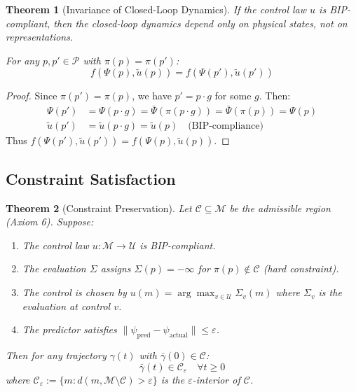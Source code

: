 \documentclass[11pt]{article}
\newtheorem{theorem}{Theorem}[section]
\begin{document}
\begin{theorem}[Invariance of Closed-Loop Dynamics]
If the control law $u$ is BIP-compliant,
then the closed-loop dynamics depend only on physical states, not on representations.

For any $p, p' \in \mathcal{P}$ with $\pi(p) = \pi(p')$:
\[
f(\Psi(p), \tilde{u}(p)) = f(\Psi(p'), \tilde{u}(p'))
\]
\end{theorem}

\begin{proof}
Since $\pi(p') = \pi(p)$, we have $p' = p \cdot g$ for some $g$. Then:
\begin{align*}
\Psi(p') &= \Psi(p \cdot g) = \bar{\Psi}(\pi(p \cdot g)) = \bar{\Psi}(\pi(p)) = \Psi(p) \\
\tilde{u}(p') &= \tilde{u}(p \cdot g) = \tilde{u}(p) \quad \text{(BIP-compliance)}
\end{align*}
Thus $f(\Psi(p'), \tilde{u}(p')) = f(\Psi(p), \tilde{u}(p))$.
\end{proof}

\subsection{Constraint Satisfaction}

\begin{theorem}[Constraint Preservation]
\label{thm:constraint}
Let $\mathcal{C} \subseteq \mathcal{M}$ be the admissible region (Axiom 6).
Suppose:
\begin{enumerate}
    \item[(i)] The control law $u : \mathcal{M} \to \mathcal{U}$ is BIP-compliant.
    \item[(ii)] The evaluation $\Sigma$ assigns $\Sigma(p) = -\infty$ for $\pi(p) \notin \mathcal{C}$ (hard constraint).
    \item[(iii)] The control is chosen by $u(m) = \arg\max_{v \in \mathcal{U}} \Sigma_v(m)$ where $\Sigma_v$ is the evaluation at control $v$.
    \item[(iv)] The predictor satisfies $\|\psi_{\mathrm{pred}} - \psi_{\mathrm{actual}}\| \leq \varepsilon$.
\end{enumerate}
Then for any trajectory $\gamma(t)$ with $\bar{\gamma}(0) \in \mathcal{C}$:
\[
\bar{\gamma}(t) \in \mathcal{C}_\varepsilon \quad \forall t \geq 0
\]
where $\mathcal{C}_\varepsilon := \{m : d(m, \mathcal{M} \setminus \mathcal{C}) > \varepsilon\}$ is the $\varepsilon$-interior of $\mathcal{C}$.
\end{theorem}
\end{document}
